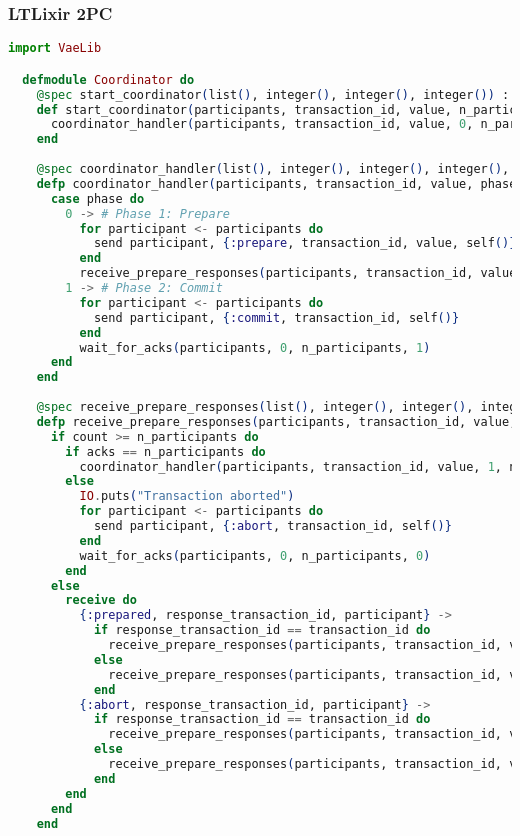 \subsubsection{LTLixir 2PC}
\begin{lstlisting}[language=Elixir, xleftmargin=.1\linewidth]
  import VaeLib

  defmodule Coordinator do
    @spec start_coordinator(list(), integer(), integer(), integer()) :: :ok
    def start_coordinator(participants, transaction_id, value, n_participants) do
      coordinator_handler(participants, transaction_id, value, 0, n_participants)
    end
  
    @spec coordinator_handler(list(), integer(), integer(), integer(), integer()) :: :ok
    defp coordinator_handler(participants, transaction_id, value, phase, n_participants) do
      case phase do
        0 -> # Phase 1: Prepare
          for participant <- participants do
            send participant, {:prepare, transaction_id, value, self()}
          end
          receive_prepare_responses(participants, transaction_id, value, 0, 0, n_participants)
        1 -> # Phase 2: Commit
          for participant <- participants do
            send participant, {:commit, transaction_id, self()}
          end
          wait_for_acks(participants, 0, n_participants, 1)
      end
    end
  
    @spec receive_prepare_responses(list(), integer(), integer(), integer(), integer(), integer()) :: :ok
    defp receive_prepare_responses(participants, transaction_id, value, count, acks, n_participants) do
      if count >= n_participants do
        if acks == n_participants do
          coordinator_handler(participants, transaction_id, value, 1, n_participants)
        else
          IO.puts("Transaction aborted")
          for participant <- participants do
            send participant, {:abort, transaction_id, self()}
          end
          wait_for_acks(participants, 0, n_participants, 0)
        end
      else
        receive do
          {:prepared, response_transaction_id, participant} ->
            if response_transaction_id == transaction_id do
              receive_prepare_responses(participants, transaction_id, value, count + 1, acks + 1, n_participants)
            else
              receive_prepare_responses(participants, transaction_id, value, count, acks, n_participants)
            end
          {:abort, response_transaction_id, participant} ->
            if response_transaction_id == transaction_id do
              receive_prepare_responses(participants, transaction_id, value, count + 1, acks, n_participants)
            else
              receive_prepare_responses(participants, transaction_id, value, count, acks, n_participants)
            end
        end
      end
    end
  

\end{lstlisting}
